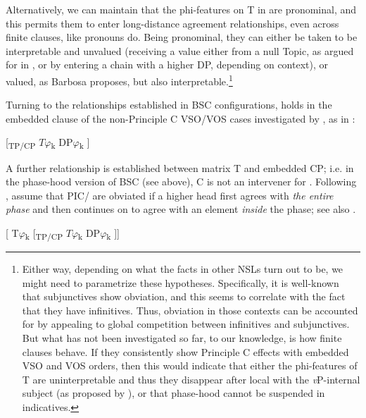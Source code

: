 \documentclass[output=paper]{langsci/langscibook}
\begin{document}
Alternatively, we can maintain that the phi-features on T in  are pronominal, and this permits them to enter long-distance agreement relationships, even across finite clauses, like pronouns do. Being pronominal, they can either be taken to be interpretable and unvalued (receiving a value either from a null Topic, as argued for in \citet{Frascarelli2007}, or by entering a chain with a higher DP, depending on context), or valued, as Barbosa proposes, but also interpretable.\footnote{Either way, depending on what the facts in other NSLs turn out to be, we might need to parametrize these hypotheses. Specifically, it is well-known that  subjunctives show obviation, and this seems to correlate with the fact that they have infinitives. Thus, obviation in those contexts can be accounted for by appealing to global competition between infinitives and subjunctives. But what has not been investigated so far, to our knowledge, is how finite clauses behave. If they consistently show Principle C effects with embedded VSO and VOS orders, then this would indicate that either the phi-features of T are uninterpretable and thus they disappear after local  with the \textit{v}P-internal subject (as proposed by \citealt{Barbosa2009}), or that phase-hood cannot be suspended in  indicatives.} 

Turning to the  relationships established in BSC configurations,  holds in the embedded clause of the non-Principle C VSO\slash VOS cases investigated by \citet{Tsakali2017}, as in :

\ea%
    \label{ex:alexiadou:31}
     \textsubscript{} [\textsubscript{TP/CP}    $T\varphi $\textsubscript{k}    DP$\varphi $\textsubscript{k}  ] 
\z
       

A further  relationship is established between matrix T and embedded CP; i.e. in the phase-hood version of BSC (see above), C is not an intervener for . Following \citet{Rackowski2005}, \citet{Tsakali2017} assume that PIC\slash {} are obviated if a higher head first agrees with \textit{the entire phase} and then continues on to agree with an element \textit{inside} the phase; see also \citet{Halpert2016}. 

\ea%
    \label{ex:alexiadou:32}
    [   T$\varphi $\textsubscript{k} [\textsubscript{TP/CP}    $T\varphi $\textsubscript{k}    DP$\varphi $\textsubscript{k}  ]]      
\z
    
\end{document}
